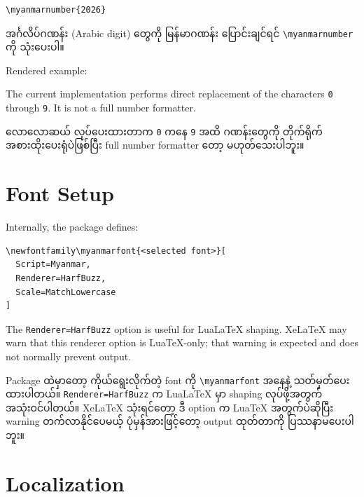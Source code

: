 \documentclass[a4paper,11pt]{article}
\newcommand{\cmd}[1]{\texttt{\textbackslash #1}}
\newenvironment{burmese}
  {\par\smallskip\begin{myanmar}\sloppy}
  {\par\end{myanmar}\fussy\smallskip}
\begin{document}
\begin{Verbatim}
\myanmarnumber{2026}
\end{Verbatim}

\begin{burmese}
အင်္ဂလိပ်ဂဏန်း (Arabic digit) တွေကို မြန်မာဂဏန်း ပြောင်းချင်ရင် \cmd{myanmarnumber} ကို 
သုံးပေးပါ။
\end{burmese}

Rendered example:

\begin{quote}
\end{quote}

The current implementation performs direct replacement of the characters
\texttt{0} through \texttt{9}. It is not a full number formatter.

\begin{burmese}
လောလောဆယ် လုပ်ပေးထားတာက \texttt{0} ကနေ \texttt{9} အထိ ဂဏန်းတွေကို 
တိုက်ရိုက် အစားထိုးပေးရုံပဲဖြစ်ပြီး full number formatter တော့ မဟုတ်သေးပါဘူး။
\end{burmese}

\section{Font Setup}

Internally, the package defines:

\begin{Verbatim}
\newfontfamily\myanmarfont{<selected font>}[
  Script=Myanmar,
  Renderer=HarfBuzz,
  Scale=MatchLowercase
]
\end{Verbatim}

The \texttt{Renderer=HarfBuzz} option is useful for LuaLaTeX shaping. XeLaTeX
may warn that this renderer option is LuaTeX-only; that warning is expected and
does not normally prevent output.

\begin{burmese}
Package ထဲမှာတော့ ကိုယ်ရွေးလိုက်တဲ့ font ကို \cmd{myanmarfont} အနေနဲ့ 
သတ်မှတ်ပေးထားပါတယ်။ \texttt{Renderer=HarfBuzz} က LuaLaTeX မှာ shaping 
လုပ်ဖို့အတွက် အသုံးဝင်ပါတယ်။ XeLaTeX သုံးရင်တော့ ဒီ option က LuaTeX အတွက်ပဲဆိုပြီး 
warning တက်လာနိုင်ပေမယ့် ပုံမှန်အားဖြင့်တော့ output ထုတ်တာကို ပြဿနာမပေးပါဘူး။
\end{burmese}

\section{Localization}
\end{document}

